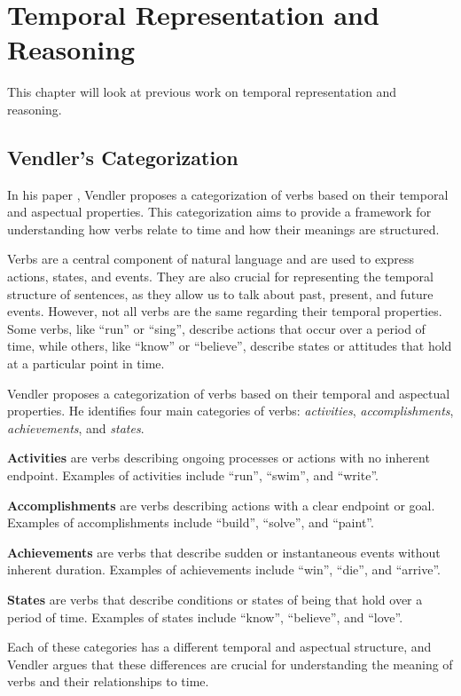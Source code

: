 \chapter{Temporal Representation and Reasoning}
\label{ch:states-and-events}
This chapter will look at previous work on temporal representation and reasoning.


\section{Vendler's Categorization}

In his paper \cite{vendler1957verbs}, Vendler proposes a categorization of verbs based on their temporal and aspectual properties. This categorization aims to provide a framework for understanding how verbs relate to time and how their meanings are structured.

Verbs are a central component of natural language and are used to express actions, states, and events. They are also crucial for representing the temporal structure of sentences, as they allow us to talk about past, present, and future events. However, not all verbs are the same regarding their temporal properties. Some verbs, like ``run'' or ``sing'', describe actions that occur over a period of time, while others, like ``know'' or ``believe'', describe states or attitudes that hold at a particular point in time.


Vendler proposes a categorization of verbs based on their temporal and aspectual properties. He identifies four main categories of verbs: \textit{activities}, \textit{accomplishments}, \textit{achievements}, and \textit{states}.

\textbf{Activities} are verbs describing ongoing processes or actions with no inherent endpoint. Examples of activities include ``run'', ``swim'', and ``write''.


\textbf{Accomplishments} are verbs describing actions with a clear endpoint or goal. Examples of accomplishments include ``build'', ``solve'', and ``paint''.


\textbf{Achievements} are verbs that describe sudden or instantaneous events without inherent duration. Examples of achievements include ``win'', ``die'', and ``arrive''.


\textbf{States} are verbs that describe conditions or states of being that hold over a period of time. Examples of states include ``know'', ``believe'', and ``love''.

Each of these categories has a different temporal and aspectual structure, and Vendler argues that these differences are crucial for understanding the meaning of verbs and their relationships to time.



